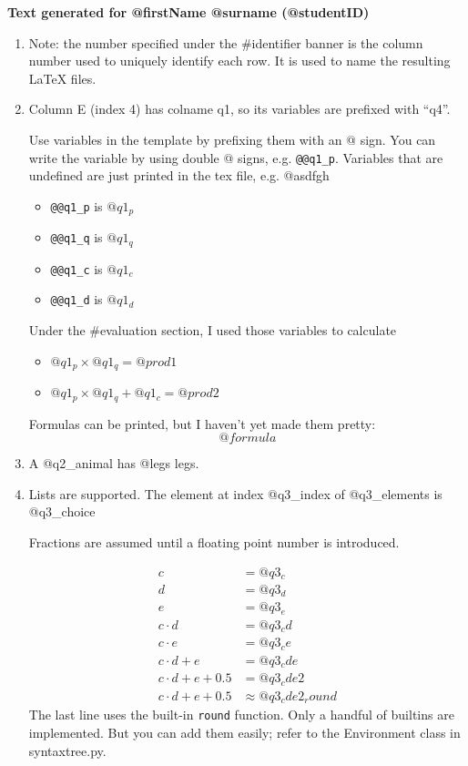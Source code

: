 \documentclass[a4paper,12pt]{article}
\begin{document}
{
\Large
\noindent 
\bfseries
Text generated for @firstName @surname (@studentID)
}

\bigskip
\noindent

\begin{enumerate}
	\item
		Note: the number specified under the \#identifier banner is the column number used to uniquely identify each row.
		It is used to name the resulting LaTeX files.
	\item 
		Column E (index 4) has colname q1, so its variables are prefixed with ``q4''.

		Use variables in the template by prefixing them with an @ sign.
		You can write the variable by using double @ signs, e.g. \verb|@@q1_p|.
		Variables that are undefined are just printed in the tex file, e.g. @asdfgh 
		\begin{itemize}
			\item \verb|@@q1_p| is $@q1_p$
			\item \verb|@@q1_q| is $@q1_q$
			\item \verb|@@q1_c| is $@q1_c$
			\item \verb|@@q1_d| is $@q1_d$
		\end{itemize}

		Under the \#evaluation section, I used those variables to calculate

		\begin{itemize}
			\item $@q1_p \times @q1_q = @prod1$
			\item $@q1_p \times @q1_q + @q1_c = @prod2$
		\end{itemize}

		Formulas can be printed, but I haven't yet made them pretty:
		\[
			@formula
		\]
		
	\item
		A @q2_animal has @legs legs.
		
	\item 
		Lists are supported.
		The element at index @q3_index of @q3_elements is @q3_choice

		Fractions are assumed until a floating point number is introduced.

		\begin{align*}
			c &= @q3_c\\
			d &= @q3_d\\
			e &= @q3_e\\
			c\cdot d &= @q3_cd\\
			c\cdot e &= @q3_ce\\
			c\cdot d + e &= @q3_cde\\
			c\cdot d + e + 0.5 &= @q3_cde2\\
			c\cdot d + e + 0.5 &\approx @q3_cde2_round
		\end{align*}
		The last line uses the built-in \texttt{round} function.
		Only a handful of builtins are implemented.
			But you can add them easily; refer to the Environment class in syntaxtree.py.



\end{enumerate}
\end{document}
